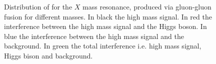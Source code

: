 \begin{figure}[htbp]
\centering
{}
\caption{Distribution of for the $X$ mass resonance, produced via gluon-gluon fusion for different masses. In black the high mass signal. In red the interference between the high mass signal and the Higgs boson. In blue the interference between the high mass signal and the background. In green the total interference i.e. high 
mass signal, Higgs bison and background. }
    \label{fig:X300}
\end{figure}


